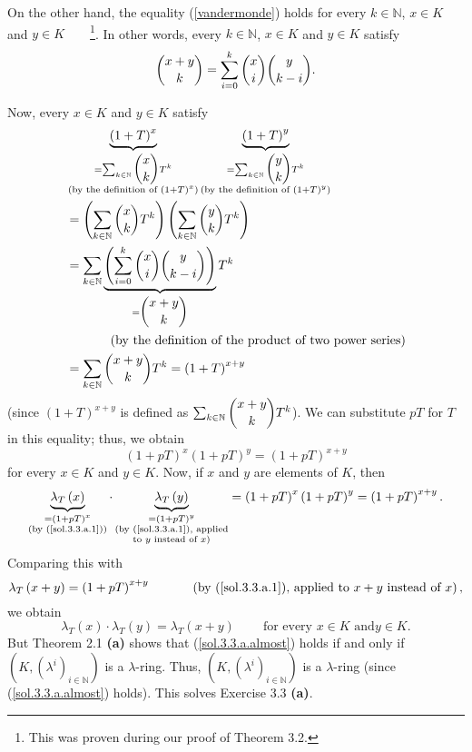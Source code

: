 \documentclass[numbers=enddot,12pt,final,onecolumn,notitlepage]{scrartcl}%
\begin{document}
On the other hand, the equality (\ref{vandermonde}) holds for every
$k\in\mathbb{N}$, $x\in K$ and $y\in K$\ \ \ \ \footnote{This was proven
during our proof of Theorem 3.2.}. In other words, every $k\in\mathbb{N}$,
$x\in K$ and $y\in K$ satisfy%
\begin{equation}
\dbinom{x+y}{k}=\sum_{i=0}^{k}\dbinom{x}{i}\dbinom{y}{k-i}.
\label{sol.3.3.a.vandermonde}%
\end{equation}


Now, every $x\in K$ and $y\in K$ satisfy%
\begin{align*}
&  \underbrace{\left(  1+T\right)  ^{x}}_{\substack{=\sum_{k\in\mathbb{N}%
}\dbinom{x}{k}T^{k}\\\text{(by the definition of }\left(  1+T\right)
^{x}\text{)}}}\underbrace{\left(  1+T\right)  ^{y}}_{\substack{=\sum
_{k\in\mathbb{N}}\dbinom{y}{k}T^{k}\\\text{(by the definition of }\left(
1+T\right)  ^{y}\text{)}}}\\
&  =\left(  \sum_{k\in\mathbb{N}}\dbinom{x}{k}T^{k}\right)  \left(  \sum
_{k\in\mathbb{N}}\dbinom{y}{k}T^{k}\right) \\
&  =\sum_{k\in\mathbb{N}}\underbrace{\left(  \sum_{i=0}^{k}\dbinom{x}%
{i}\dbinom{y}{k-i}\right)  }_{=\dbinom{x+y}{k}}T^{k}\\
&  \ \ \ \ \ \ \ \ \ \ \left(  \text{by the definition of the product of two
power series}\right) \\
&  =\sum_{k\in\mathbb{N}}\dbinom{x+y}{k}T^{k}=\left(  1+T\right)  ^{x+y}%
\end{align*}
(since $\left(  1+T\right)  ^{x+y}$ is defined as $\sum_{k\in\mathbb{N}%
}\dbinom{x+y}{k}T^{k}$). We can substitute $pT$ for $T$ in this equality;
thus, we obtain%
\[
\left(  1+pT\right)  ^{x}\left(  1+pT\right)  ^{y}=\left(  1+pT\right)  ^{x+y}%
\]
for every $x\in K$ and $y\in K$. Now, if $x$ and $y$ are elements of $K$, then%
\[
\underbrace{\lambda_{T}\left(  x\right)  }_{\substack{=\left(  1+pT\right)
^{x}\\\text{(by (\ref{sol.3.3.a.1}))}}}\cdot\underbrace{\lambda_{T}\left(
y\right)  }_{\substack{=\left(  1+pT\right)  ^{y}\\\text{(by
(\ref{sol.3.3.a.1}), applied}\\\text{to }y\text{ instead of }x\text{)}%
}}=\left(  1+pT\right)  ^{x}\left(  1+pT\right)  ^{y}=\left(  1+pT\right)
^{x+y}.
\]
Comparing this with%
\[
\lambda_{T}\left(  x+y\right)  =\left(  1+pT\right)  ^{x+y}%
\ \ \ \ \ \ \ \ \ \ \left(  \text{by (\ref{sol.3.3.a.1}), applied to
}x+y\text{ instead of }x\right)  ,
\]
we obtain
\begin{equation}
\lambda_{T}\left(  x\right)  \cdot\lambda_{T}\left(  y\right)  =\lambda
_{T}\left(  x+y\right)  \ \ \ \ \ \ \ \ \ \ \text{for every }x\in K\text{ and
}y\in K. \label{sol.3.3.a.almost}%
\end{equation}
But Theorem 2.1 \textbf{(a)} shows that (\ref{sol.3.3.a.almost}) holds if and
only if $\left(  K,\left(  \lambda^{i}\right)  _{i\in\mathbb{N}}\right)  $ is
a $\lambda$-ring. Thus, $\left(  K,\left(  \lambda^{i}\right)  _{i\in
\mathbb{N}}\right)  $ is a $\lambda$-ring (since (\ref{sol.3.3.a.almost})
holds). This solves Exercise 3.3 \textbf{(a)}.
\end{document}
